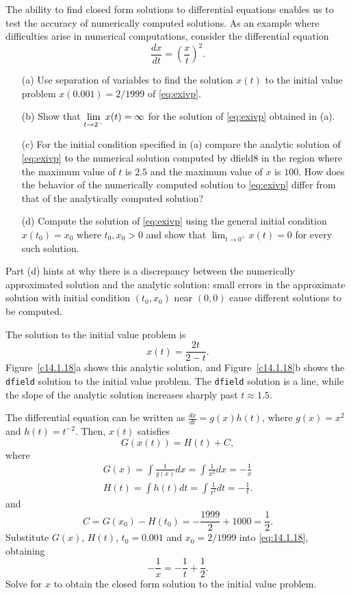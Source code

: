 \documentclass{ximera}
\begin{document}
\begin{exercise} \label{c14.1.18}
The ability to find closed form solutions to differential equations enables
us to test the accuracy of numerically computed solutions.  As an example where difficulties arise in numerical computations, consider the differential 
equation
\begin{equation} \label{eq:exivp}
\frac{dx}{dt} = \left(\frac{x}{t}\right)^2.
\end{equation}
\begin{itemize}
\item[(a)] Use separation of variables to find the solution $x(t)$ to the 
initial value problem $x(0.001) = 2/1999$ of \eqref{eq:exivp}.
\item[(b)] Show that $\displaystyle\lim_{t\to 2^-}x(t)=\infty$ for the solution of 
\eqref{eq:exivp} obtained in (a).
\item[(c)] For the initial condition specified in (a) compare the analytic 
solution of \eqref{eq:exivp} to the numerical solution computed by {\sf dfield8} 
in the region where the maximum value of $t$ is $2.5$ and the maximum value of 
$x$ is $100$.  How does the behavior of the numerically computed solution 
to \eqref{eq:exivp} differ from that of the analytically computed solution?
\item[(d)]  Compute the solution of \eqref{eq:exivp} using the general initial 
condition $x(t_0) = x_0$ where $t_0,x_0>0$ and show that 
$\lim_{t\to 0^+}x(t)=0$ for every such solution. 
\end{itemize}
 Part (d) hints at why there is a discrepancy 
between the numerically approximated solution and the analytic solution: 
small errors in the approximate solution with initial condition $(t_0,x_0)$ 
near $(0,0)$ cause different solutions to be computed.

\begin{solution}
\ans The solution to the initial value problem is
\[
x(t) = \frac{2t}{2 - t}.
\]
Figure~\ref{c14.1.18}a shows this analytic solution, and
Figure~\ref{c14.1.18}b shows the {\tt dfield} solution to the initial
value problem.  The {\tt dfield} solution is a line, while the slope
of the analytic solution increases sharply past $t \approx 1.5$.

\soln The differential equation can be written as $\frac{dx}{dt} = g(x)h(t)$,
where $g(x) = x^2$ and $h(t) = t^{-2}$.  Then, $x(t)$ satisfies
\begin{equation} \label{eq:14.1.18}
G(x(t)) = H(t) + C,
\end{equation}
where
\[
\begin{array}{l}
G(x) = \int\frac{1}{g(x)}dx = \int\frac{1}{x^2}dx = -\frac{1}{x} \\
H(t) = \int h(t)dt = \int\frac{1}{t^2}dt = -\frac{1}{t}.
\end{array}
\]
and
\[
C = G(x_0) - H(t_0) = -\frac{1999}{2} + 1000  = \frac{1}{2}.
\]
Substitute $G(x)$, $H(t)$, $t_0 = 0.001$ and $x_0 = 2/1999$ into
\eqref{eq:14.1.18}, obtaining
\[
-\frac{1}{x} = -\frac{1}{t} + \frac{1}{2}.
\]
Solve for $x$ to obtain the closed form solution to the initial value problem.


\end{solution}
\end{exercise}
\end{document}

